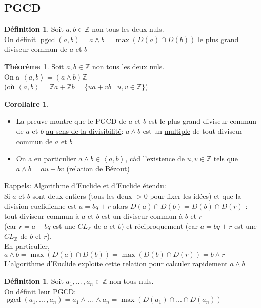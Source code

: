 \documentclass[10pt,a4paper]{article}
\theoremstyle{definition}
\newtheorem{theorem}[proposition]{Théorème}
\newtheorem{corollaire}[proposition]{Corollaire}
\newtheorem{definition}[proposition]{Définition}
\DeclareMathOperator{\pgcd}{pgcd}
\begin{document}
\subsection{PGCD}
\begin{definition}
Soit $a, b \in \mathbb{Z}$ non tous les deux nuls. \\
On définit $\pgcd(a, b) = a \wedge b = \max\left(D(a) \cap D(b)\right)$ le plus grand diviseur commun de $a$ et $b$
\end{definition}
\begin{theorem}
Soit $a, b \in \mathbb{Z}$ non tous les deux nuls. \\
On a $\left<a ,b\right> = (a \wedge b)\mathbb{Z}$ \\
(où $\left<a, b\right> = \mathbb{Z}a + \mathbb{Z}b = \{ ua + vb \mid u, v \in \mathbb{Z} \}$)
\end{theorem}
\begin{corollaire}
\hfill
\begin{itemize}
\item La preuve montre que le PGCD de $a$ et $b$ est le plus grand diviseur commun de $a$ et $b$ \uline{au sens de la divisibilité}: $a \wedge b$ est un \uline{multiple} de tout diviseur commun de $a$ et $b$
\item On a en particulier $a \wedge b \in \left< a, b \right>$, càd l'existence de $u, v \in \mathbb{Z}$ tels que $a \wedge b = au + bv$ (relation de Bézout)
\end{itemize}
\end{corollaire}
\noindent \uline{Rappels}: Algorithme d'Euclide et d'Euclide étendu: \\
Si $a$ et $b$ sont deux entiers (tous les deux $> 0$ pour fixer les idées) et que la division euclidienne est $a = bq + r$ alors $D(a) \cap D(b) = D(b) \cap D(r)$ : tout diviseur commun à $a$ et $b$ est un diviseur commun à $b$ et $r$ \\
(car $r = a - bq$ est une $CL_\mathbb{Z}$ de $a$ et $b$) et réciproquement (car $a = bq + r$ est une $CL_\mathbb{Z}$ de $b$ et $r$). \\
En particulier, $a \wedge b = \max\left( D(a) \cap D(b)\right) = \max\left(D(b) \cap D(r)\right) = b \wedge r$ \\
L'algorithme d'Euclide exploite cette relation pour calculer rapidement $a \wedge b$
\begin{definition}
Soit $a_1, ...\,, a_n \in \mathbb{Z}$ non tous nuls. \\
On définit leur \uline{PGCD}: $\pgcd(a_1, ...\,, a_n) = a_1 \wedge ...\, \wedge a_n = \max\left( D(a_1) \cap ... \cap D(a_n)\right)$
\end{definition}
\end{document}
